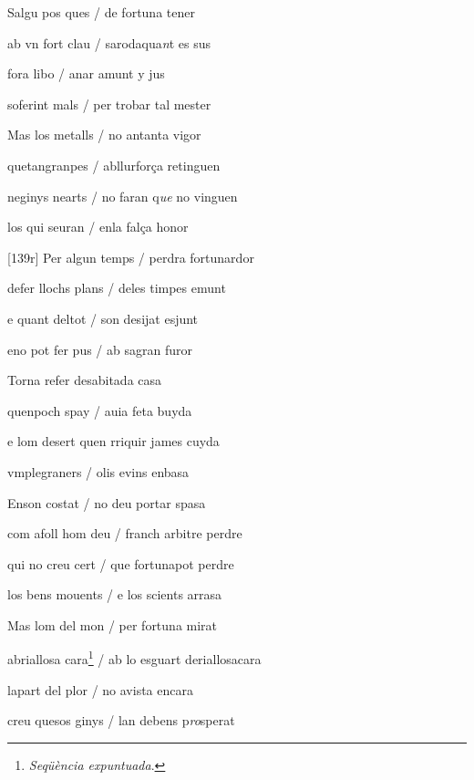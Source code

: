 \documentclass[12pt]{article}
\begin{document}
\begin{estrofa}

 Salgu pos ques / de fortuna tener

 ab vn fort clau / sarodaqua\textit{n}t es sus

 fora libo / anar amunt y jus

 soferint mals / per trobar tal mester

 Mas los metalls / no antanta vigor

 quetangranpes / abllurfor\c{c}a retinguen

 neginys nearts / no faran q\textit{ue} no vinguen

 los qui seuran / enla fal\c{c}a honor

\end{estrofa}



\begin{estrofa}

 [139r] Per algun temps / perdra fortunardor

 defer llochs plans / deles timpes emunt

 e quant deltot / son desijat esjunt

 eno pot fer pus / ab sagran furor

 Torna refer desabitada casa

 quenpoch spay / auia feta buyda

 e lom desert quen rriquir james cuyda

 vmplegraners / olis evins enbasa

\end{estrofa}



\begin{estrofa}

 Enson costat / no deu portar spasa

 com afoll hom deu / franch arbitre perdre

 qui no creu cert / que fortunapot perdre

 los bens mouents / e los scients arrasa

 Mas lom del mon / per fortuna mirat

 abriallosa cara\footnote{\textit{Seq\"{u}\`{e}ncia expuntuada}.} / ab lo esguart
deriallosacara

 lapart del plor / no avista encara

 creu quesos ginys / lan debens p\textit{ro}sperat

\end{estrofa}
\end{document}
